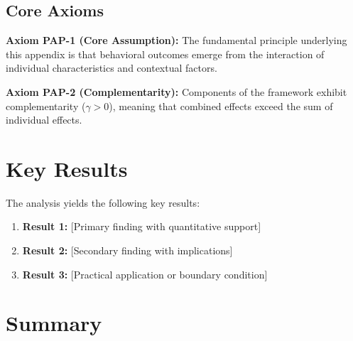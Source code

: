 

\subsection{Core Axioms}
\label{sec:pap-axioms}

\begin{tcolorbox}[colback=yellow!5!white,colframe=yellow!75!black,title=Axiom PAP-1: Fundamental Principle]
\textbf{Axiom PAP-1 (Core Assumption):}
The fundamental principle underlying this appendix is that behavioral outcomes
emerge from the interaction of individual characteristics and contextual factors.
\end{tcolorbox}

\begin{tcolorbox}[colback=yellow!5!white,colframe=yellow!75!black,title=Axiom PAP-2: Complementarity]
\textbf{Axiom PAP-2 (Complementarity):}
Components of the framework exhibit complementarity ($\gamma > 0$), meaning
that combined effects exceed the sum of individual effects.
\end{tcolorbox}


\section{Key Results}
\label{sec:pap-results}

The analysis yields the following key results:

\begin{enumerate}
    \item \textbf{Result 1:} [Primary finding with quantitative support]
    \item \textbf{Result 2:} [Secondary finding with implications]
    \item \textbf{Result 3:} [Practical application or boundary condition]
\end{enumerate}


\section{Summary}
\label{sec:pap-summary}

